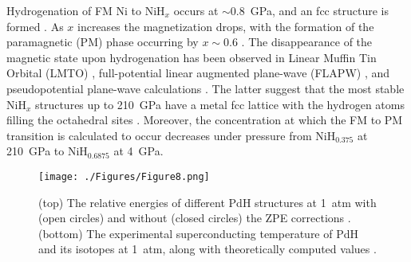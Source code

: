 \documentclass[12pt,letterpaper,oneside]{article}
\begin{document}
Hydrogenation of FM Ni to NiH$_x$ occurs at $\sim$0.8~GPa, and an fcc structure is formed \cite{Ishimatsu:2012}. As $x$ increases the magnetization drops, with the formation of the paramagnetic (PM) phase occurring by $x\sim0.6$ \cite{Bauer:1961a}. The disappearance of the magnetic state upon hydrogenation has been observed in Linear Muffin Tin Orbital (LMTO) \cite{Vargas:1987},  full-potential linear augmented plane-wave (FLAPW) \cite{Ishimatsu:2012}, and pseudopotential plane-wave calculations \cite{San:2006}. The latter suggest that the most stable NiH$_x$ structures up to 210~GPa have a metal fcc lattice with the hydrogen atoms filling the octahedral sites \cite{San:2006}. Moreover, the concentration at which the FM to PM transition is calculated to occur decreases under pressure from NiH$_{0.375}$ at 210~GPa to NiH$_{0.6875}$ at 4~GPa. 
%
\begin{figure}[h!]
\begin{center}
\texttt{[image: ./Figures/Figure8.png]}
\end{center}
\caption{(top) The relative energies of different PdH structures at 1~atm with (open circles) and without (closed circles) the ZPE corrections \cite{Houari:2014}. (bottom) The experimental superconducting temperature of PdH and its isotopes at 1~atm\cite{Stritzker:1972}, along with theoretically computed values \cite{Errea:2013}.}
\label{fig:pdh}
\end{figure}
\end{document}
